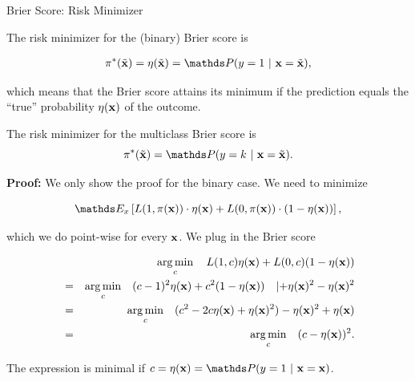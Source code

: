 \documentclass[11pt,compress,t,notes=noshow, xcolor=table]{beamer}
\begin{document}
\begin{vbframe}{Brier Score: Risk Minimizer}

The risk minimizer for the (binary) Brier score is 

\begin{eqnarray*}
\piastxtil = \eta(\xtil) = \P(y=1~|~\xv = \xtil),
\end{eqnarray*}

which means that the Brier score attains its minimum if the prediction equals the \enquote{true} probability $\eta(\mathbf{x})$ of the outcome. 

\lz 

The risk minimizer for the multiclass Brier score is 
$$\piastxtil = \P(y = k ~|~ \xv = \xtil). $$
 

\textbf{Proof: } We only show the proof for the binary case. We need to minimize 

$$
\E_x \left[L(1, \pix) \cdot \eta(\xv) + L(0, \pix) \cdot (1 - \eta(\xv)) \right],
$$

which we do point-wise for every $\mathbf{x}$. We plug in the Brier score

\vspace*{-0.3cm}

\begin{eqnarray*}
	&& \operatorname*{arg\,min}_c \quad L(1, c) \eta(\mathbf{x}) + L(0, c) (1 - \eta(\mathbf{x})) \\ 
	&=&  \operatorname*{arg\,min}_c \quad (c - 1)^2 \eta(\mathbf{x}) + c^2 (1 - \eta(\mathbf{x}))  \quad |{+\eta(\mathbf{x})^2-\eta(\mathbf{x})^2}\\
  &=&  \operatorname*{arg\,min}_c \quad (c^2 -2c\eta(\mathbf{x}) + \eta(\mathbf{x})^2)- \eta(\mathbf{x})^2 + \eta(\mathbf{x}) \\
	&=&  \operatorname*{arg\,min}_c \quad (c - \eta(\mathbf{x}))^2.
\end{eqnarray*}

The expression is minimal if $c = \eta(\xv) = \P(y = 1~|~\xv = \xv)$.

\end{vbframe}
\end{document}

